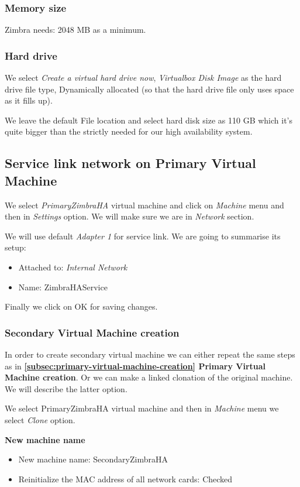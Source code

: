 \subsubsection {Memory size}
Zimbra needs: 2048 MB as a minimum.
\subsubsection {Hard drive}
We select \textit{Create a virtual hard drive now}, \textit{Virtualbox Disk Image} as the hard drive file type, Dynamically allocated (so that the hard drive file only uses space as it fills up).

We leave the default File location and select hard disk size as 110 GB which it's quite bigger than the strictly needed for our high availability system.

\subsection {\label{subsec:service-link-primary}Service link network on Primary Virtual Machine}
We select \textit{PrimaryZimbraHA} virtual machine and click on \textit{Machine} menu and then in \textit{Settings} option. We will make sure we are in \textit{Network} section.

We will use default \textit{Adapter 1} for service link. We are going to summarise its setup:
\begin{itemize}
  \item Attached to: \textit{Internal Network}
  \item Name: ZimbraHAService
\end{itemize}

Finally we click on OK for saving changes.

\subsubsection {Secondary Virtual Machine creation}
In order to create secondary virtual machine we can either repeat the same steps as in \textbf{\ref{subsec:primary-virtual-machine-creation} Primary Virtual Machine creation}. Or we can make a linked clonation of the original machine. We will describe the latter option.

We select PrimaryZimbraHA virtual machine and then in \textit{Machine} menu we select \textit{Clone} option.

\textbf{New machine name}
\begin{itemize}
  \item New machine name: SecondaryZimbraHA
  \item Reinitialize the MAC address of all network cards: Checked
\end{itemize}

